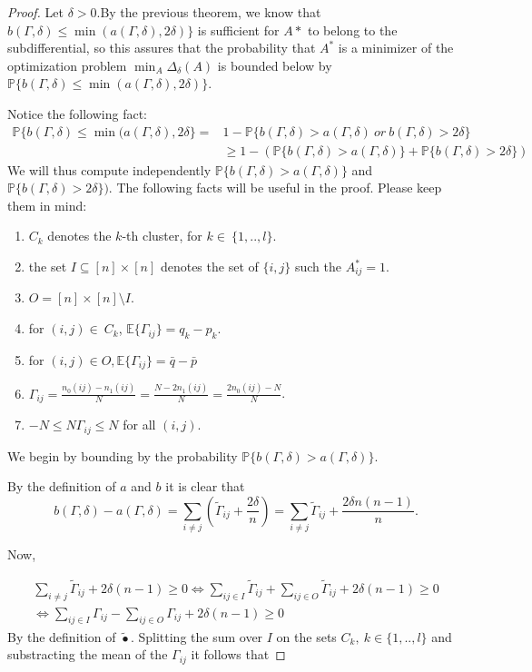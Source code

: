 \documentclass[12pt]{amsart}
\numberwithin{equation}{section}
\newcommand{\PP}{\mathbb{P}}
\newcommand{\EE}{\mathbb{E}}
\begin{document}
\begin{proof}

Let $\delta>0$.By the previous theorem, we know that 
$b(\Gamma,\delta)\leq \min \left(a(\Gamma,\delta), 2\delta\right)\}$ is sufficient for $A*$ to belong to the subdifferential, so this assures that
 the probability that $A^*$ is a minimizer of the optimization problem $\min_A\Delta_{\delta}(A)$ is bounded below by $\mathbb{P}\{ b(\Gamma,\delta)\leq \min \left(a(\Gamma,\delta), 2\delta\right)\}$.

Notice the following fact:
\[
\begin{aligned}
\PP\{b(\Gamma,\delta) \leq \min(a(\Gamma,\delta),2\delta \} = {} & 1-\PP\{b(\Gamma,\delta) > a(\Gamma,\delta) \ or \  b(\Gamma,\delta)>2\delta \} \\
& \geq 1-(\PP\{b(\Gamma,\delta)>a(\Gamma,\delta)\}+ \PP\{b(\Gamma,\delta)> 2\delta\})
\end{aligned}
\]
We will thus compute independently $\PP\{b(\Gamma,\delta)>a(\Gamma,\delta)\}$ and $ \PP\{b(\Gamma,\delta)> 2\delta\})$.
The following facts will be useful in the proof. Please keep them in mind:
\begin{enumerate}
\item $C_k$ denotes the $k$-th cluster, for $k \in \  \{1,..,l\}$.
\item the set $I\subseteq [n]\times [n]$ denotes the set of $\{i,j\}$ such the $A^*_{ij}=1$.
\item $O = [n]\times[n]\setminus I$.
\item for $(i,j)\in \ C_k$, $\EE\{\Gamma_{ij}\}= q_k-p_k. $
\item for $(i,j)\in O, \EE\{\Gamma_{ij} \}= \bar{q}-\bar{p}$
\item $\Gamma_{ij}=\frac{n_0(ij)-n_1(ij)}{N}=\frac{N-2n_1(ij)}{N}= \frac{2n_0(ij)-N}{N}$.
\item $-N \leq N\Gamma_{ij}\leq N$ for all $(i,j)$.
\end{enumerate}

We begin by bounding by the probability $\PP\{b(\Gamma,\delta)>a(\Gamma,\delta)\}$.

By the definition of $a$ and $b$ it is clear that
\[b(\Gamma,\delta)-a(\Gamma,\delta)=\sum_{i\neq j} \left(\widetilde{\Gamma}_{ij}+\frac{2\delta}{n}\right) = \sum_{i\neq j} \widetilde{\Gamma}_{ij} + \frac{2\delta n(n-1)}{n}. \]

Now, 

\[
\begin{aligned}
 \sum_{i\neq j}\widetilde{\Gamma}_{ij} + 2\delta (n-1) \geq 0 \Leftrightarrow  \sum_{ij \in I}\widetilde{\Gamma}_{ij} + \sum_{ij \in O}\widetilde{\Gamma}_{ij}  + 2\delta(n-1) \geq 0  \\
 \Leftrightarrow \sum_{ij \in I}\Gamma_{ij} - \sum_{ij \in O} \Gamma_{ij} + 2\delta(n-1) \geq 0 
\end{aligned}
\]
By the definition of $\widetilde{\bullet}$.
Splitting the sum over $I$ on the sets $C_k, \ k \in \{1,..,l\}$ and substracting the mean of the $\Gamma_{ij}$ it follows that



\end{proof}
\end{document}

